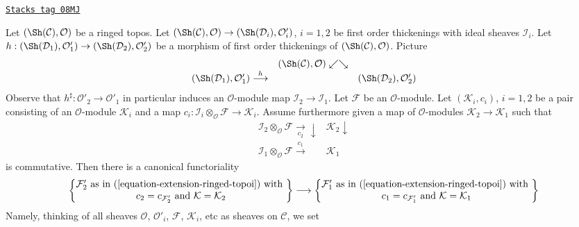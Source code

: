 \begin{remark}
\label{defos-remark-extension-functorial-ringed-topoi}
\href{https://stacks.math.columbia.edu/tag/08MJ}{\texttt{Stacks tag 08MJ}}

Let $(\Sh(\mathcal{C}), \mathcal{O})$ be a ringed topos. Let
$(\Sh(\mathcal{C}), \mathcal{O}) \to (\Sh(\mathcal{D}_i), \mathcal{O}'_i)$,
$i = 1, 2$ be first order thickenings with ideal sheaves $\mathcal{I}_i$.
Let $h : (\Sh(\mathcal{D}_1), \mathcal{O}'_1) \to
(\Sh(\mathcal{D}_2), \mathcal{O}'_2)$
be a morphism of first order thickenings of $(\Sh(\mathcal{C}), \mathcal{O})$.
Picture
$$
\begin{array}{ccc} & (\Sh(\mathcal{C}), \mathcal{O}) \swarrow\searrow &  \\ (\Sh(\mathcal{D}_1), \mathcal{O}'_1) \overset{h}{\longrightarrow} &  & (\Sh(\mathcal{D}_2), \mathcal{O}'_2)\end{array}
$$
Observe that $h^\sharp : \mathcal{O}'_2 \to \mathcal{O}'_1$
in particular induces an $\mathcal{O}$-module map
$\mathcal{I}_2 \to \mathcal{I}_1$.
Let $\mathcal{F}$ be an $\mathcal{O}$-module.
Let $(\mathcal{K}_i, c_i)$, $i = 1, 2$ be a pair
consisting of an $\mathcal{O}$-module $\mathcal{K}_i$ and a map
$c_i : \mathcal{I}_i \otimes_\mathcal{O} \mathcal{F} \to
\mathcal{K}_i$. Assume furthermore given a map
of $\mathcal{O}$-modules $\mathcal{K}_2 \to \mathcal{K}_1$
such that
$$
\begin{array}{cc}\mathcal{I}_2 \otimes_\mathcal{O} \mathcal{F}
\underset{c_2}{\longrightarrow}\downarrow & \mathcal{K}_2 \downarrow \\ \mathcal{I}_1 \otimes_\mathcal{O} \mathcal{F}
\overset{c_1}{\longrightarrow} & \mathcal{K}_1\end{array}
$$
is commutative. Then there is a canonical functoriality
$$
\left\{
\begin{matrix}
\mathcal{F}'_2\text{ as in (\ref{equation-extension-ringed-topoi}) with }\\
c_2 = c_{\mathcal{F}'_2}\text{ and }\mathcal{K} = \mathcal{K}_2
\end{matrix}
\right\}
\longrightarrow
\left\{
\begin{matrix}
\mathcal{F}'_1\text{ as in (\ref{equation-extension-ringed-topoi}) with }\\
c_1 = c_{\mathcal{F}'_1}\text{ and }\mathcal{K} = \mathcal{K}_1
\end{matrix}
\right\}
$$
Namely, thinking of all sheaves $\mathcal{O}$, $\mathcal{O}'_i$,
$\mathcal{F}$, $\mathcal{K}_i$, etc as sheaves on $\mathcal{C}$, we set

\end{remark}
